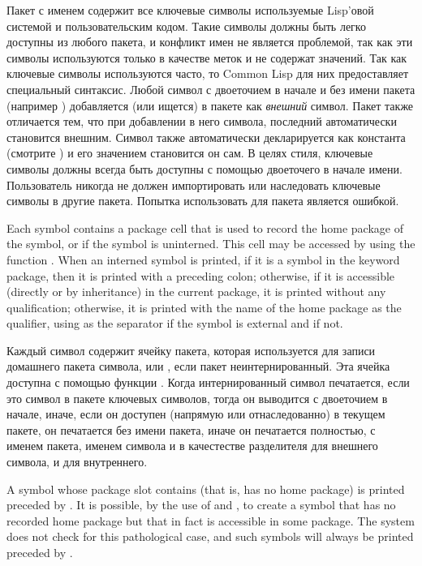 Пакет с именем  содержит все ключевые символы используемые
Lisp'овой системой и пользовательским кодом. Такие символы должны быть легко
доступны из любого пакета, и конфликт имен не является проблемой, так как эти
символы используются только в качестве меток и не содержат значений. Так как
ключевые символы используются часто, то Common Lisp для них предоставляет
специальный синтаксис. Любой символ с двоеточием в начале и без имени пакета
(например ) добавляется (или ищется) в пакете  как
\emph{внешний} символ. Пакет  также отличается тем, что при
добавлении в него символа, последний автоматически становится внешним. Символ
также автоматически декларируется как константа (смотрите ) и
его значением становится он сам.
В целях стиля, ключевые символы должны всегда быть доступны с помощью двоеточего
в начале имени. Пользователь никогда не должен импортировать или наследовать
ключевые символы в другие пакета. Попытка использовать  для
 пакета является ошибкой.

Each symbol contains a package cell that is used to record the home
package of the symbol, or {\false} if the symbol is uninterned.  This cell
may be accessed by using the function .
When an interned
symbol is printed, if it is a symbol in the keyword package,
then it is printed with a preceding colon; otherwise, if it is accessible
(directly or by inheritance) in the current package, it is printed
without any qualification; otherwise, it is printed with the name of the
home package as the qualifier, using \cd{:} as the separator if the
symbol is external and \cd{::} if not.

Каждый символ содержит ячейку пакета, которая используется для записи домашнего
пакета символа, или {\false}, если пакет неинтернированный. Эта ячейка доступна
с помощью функции .
Когда интернированный символ печатается, если это символ в пакете ключевых
символов, тогда он выводится с двоеточием в начале, иначе, если он доступен
(напрямую или отнаследованно) в текущем пакете, он печатается без имени пакета,
иначе он печатается полностью, с именем пакета, именем символа и \cd{:} в
качестестве разделителя для внешнего символа, и \cd{::} для внутреннего.

A symbol whose package slot contains {\false} (that is, has no home
package)
is printed preceded by \cd{\#:}.  It is possible, by the
use of  and , to create a symbol that has no
recorded home package but that in fact is accessible in some package.
The system does not check for this pathological case, and such symbols
will always be printed preceded by \cd{\#:}.

